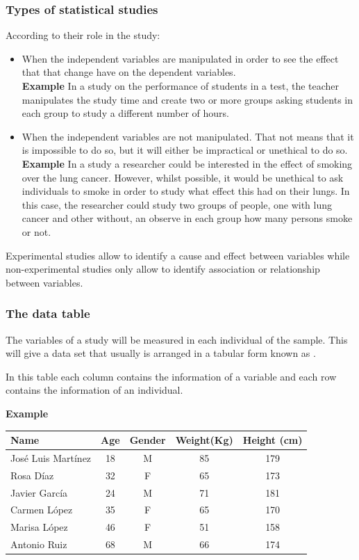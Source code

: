 \begin{frame}
\frametitle{Types of statistical studies}
According to their role in the study:
\begin{itemize}
\item {} When the independent variables are manipulated in order to see the effect that that
change have on the dependent variables.\\
\textbf{Example} In a study on the performance of students in a test, the teacher manipulates the study time and create
two or more groups asking students in each group to study a different number of hours. 
\item {} When the independent variables are not manipulated. That not means that it is
impossible to do so, but it will either be impractical or unethical to do so.\\
\textbf{Example} In a study a researcher could be interested in the effect of smoking over the lung
cancer. 
However, whilst possible, it would be unethical to ask individuals to smoke in order to study what effect this had on
their lungs. In this case, the researcher could study two groups of people, one with lung cancer and other
without, an observe in each group how many persons smoke or not. 
\end{itemize}

Experimental studies allow to identify a cause and effect between variables while non-experimental studies
only allow to identify association or relationship between variables. 
\end{frame}


\begin{frame}
\frametitle{The data table}
The variables of a study will be measured in each individual of the sample. 
This will give a data set that usually is arranged in a tabular form known as .

In this table each column contains the information of a variable and each row contains the information of an individual. 

\textbf{Example}
\begin{center}
\begin{tabular}{|l|c|c|c|c|}
\hline
Name & Age & Gender & Weight(Kg) & Height (cm)\\
\hline
José Luis Martínez & 18 & M &  85 & 179 \\
Rosa Díaz & 32 & F & 65 & 173 \\
Javier García & 24 & M & 71 & 181 \\
Carmen López & 35 & F &  65 & 170 \\
Marisa López  & 46 & F &  51 & 158 \\
Antonio Ruiz & 68 & M & 66 & 174 \\
\hline
\end{tabular}
\end{center}
\end{frame}


